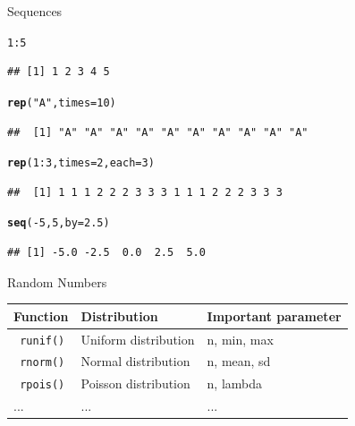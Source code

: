 \documentclass[11pt,german,hideothersubsections]{beamer}\usepackage[]{graphicx}\usepackage[]{color}
\makeatletter
\newcommand{\hlnum}[1]{\textcolor[rgb]{0.686,0.059,0.569}{#1}}%
\newcommand{\hlstr}[1]{\textcolor[rgb]{0.192,0.494,0.8}{#1}}%
\newcommand{\hlopt}[1]{\textcolor[rgb]{0,0,0}{#1}}%
\newcommand{\hlstd}[1]{\textcolor[rgb]{0.345,0.345,0.345}{#1}}%
\newcommand{\hlkwc}[1]{\textcolor[rgb]{0.333,0.667,0.333}{#1}}%
\newcommand{\hlkwd}[1]{\textcolor[rgb]{0.737,0.353,0.396}{\textbf{#1}}}%
\newenvironment{kframe}{%
 \def\at@end@of@kframe{}%
 \ifinner\ifhmode%
  \def\at@end@of@kframe{\end{minipage}}%
  \begin{minipage}{\columnwidth}%
 \fi\fi%
 \def\FrameCommand##1{\hskip\@totalleftmargin \hskip-\fboxsep
 \colorbox{shadecolor}{##1}\hskip-\fboxsep
     \hskip-\linewidth \hskip-\@totalleftmargin \hskip\columnwidth}%
 \MakeFramed {\advance\hsize-\width
   \@totalleftmargin\z@ \linewidth\hsize
   \@setminipage}}%
 {\par\unskip\endMakeFramed%
 \at@end@of@kframe}
\newenvironment{knitrout}{}{} %
\newcommand{\R}[1]{{\tt \color{blue}  #1}}
\makeatother
\begin{document}
\begin{frame}[fragile]{Sequences}
\begin{knitrout}
\color{fgcolor}\begin{kframe}
\begin{alltt}
\hlnum{1}\hlopt{:}\hlnum{5}
\end{alltt}
\begin{verbatim}
## [1] 1 2 3 4 5
\end{verbatim}
\begin{alltt}
\hlkwd{rep}\hlstd{(}\hlstr{"A"}\hlstd{,}\hlkwc{times}\hlstd{=}\hlnum{10}\hlstd{)}
\end{alltt}
\begin{verbatim}
##  [1] "A" "A" "A" "A" "A" "A" "A" "A" "A" "A"
\end{verbatim}
\begin{alltt}
\hlkwd{rep}\hlstd{(}\hlnum{1}\hlopt{:}\hlnum{3}\hlstd{,}\hlkwc{times}\hlstd{=}\hlnum{2}\hlstd{,}\hlkwc{each}\hlstd{=}\hlnum{3}\hlstd{)}
\end{alltt}
\begin{verbatim}
##  [1] 1 1 1 2 2 2 3 3 3 1 1 1 2 2 2 3 3 3
\end{verbatim}
\begin{alltt}
\hlkwd{seq}\hlstd{(}\hlopt{-}\hlnum{5}\hlstd{,}\hlnum{5}\hlstd{,}\hlkwc{by}\hlstd{=}\hlnum{2.5}\hlstd{)}
\end{alltt}
\begin{verbatim}
## [1] -5.0 -2.5  0.0  2.5  5.0
\end{verbatim}
\end{kframe}
\end{knitrout}
\end{frame}
\begin{frame}[fragile]{Random Numbers}
\begin{center}
\begin{tabular}{l|l|l}
\textbf{Function } & \textbf{Distribution} & \textbf{Important parameter} \\
\hline
\hline
\R{runif()} & Uniform distribution & n, min, max\\
\hline
\R{rnorm()} & Normal distribution & n, mean, sd \\
\hline
\R{rpois()} & Poisson distribution & n, lambda\\
\hline 
... & ... & ... \\
\end{tabular}
\end{center}
\end{frame}
\end{document}
